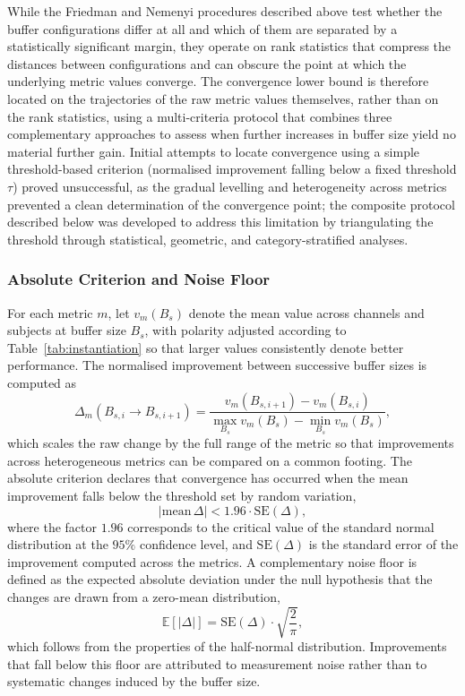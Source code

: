 \documentclass[MScCS,12pt,oneside,final]{uccthesis}
\begin{document}
While the Friedman and Nemenyi procedures described above test whether the buffer configurations differ at all and which of them are separated by a statistically significant margin, they operate on rank statistics that compress the distances between configurations and can obscure the point at which the underlying metric values converge. The convergence lower bound is therefore located on the trajectories of the raw metric values themselves, rather than on the rank statistics, using a multi-criteria protocol that combines three complementary approaches to assess when further increases in buffer size yield no material further gain. Initial attempts to locate convergence using a simple threshold-based criterion (normalised improvement falling below a fixed threshold $\tau$) proved unsuccessful, as the gradual levelling and heterogeneity across metrics prevented a clean determination of the convergence point; the composite protocol described below was developed to address this limitation by triangulating the threshold through statistical, geometric, and category-stratified analyses.

\subsubsection{Absolute Criterion and Noise Floor}

For each metric $m$, let $v_m(B_s)$ denote the mean value across channels and subjects at buffer 
size $B_s$, with polarity adjusted according to Table~\ref{tab:instantiation} so that larger 
values consistently denote better performance. The normalised improvement between successive 
buffer sizes is computed as
\begin{equation}
    \Delta_m(B_{s,i} \to B_{s,i+1}) = \frac{v_m(B_{s,i+1}) - v_m(B_{s,i})}{\max_{B_s} v_m(B_s) - \min_{B_s} v_m(B_s)},
    \label{eq:normalised_improvement}
\end{equation}
which scales the raw change by the full range of the metric so that improvements across 
heterogeneous metrics can be compared on a common footing. The absolute criterion 
declares that convergence has occurred when the mean improvement falls below the threshold set 
by random variation,
\begin{equation}
    |\text{mean}\,\Delta| < 1.96 \cdot \text{SE}(\Delta),
    \label{eq:absolute_criterion}
\end{equation}
where the factor $1.96$ corresponds to the critical value of the standard normal distribution at 
the $95\%$ confidence level, and $\text{SE}(\Delta)$ is the standard error of the improvement 
computed across the metrics. A complementary noise floor is defined as the expected 
absolute deviation under the null hypothesis that the changes are drawn from a zero-mean 
distribution,
\begin{equation}
    \mathbb{E}[|\Delta|] = \text{SE}(\Delta) \cdot \sqrt{\frac{2}{\pi}},
    \label{eq:noise_floor}
\end{equation}
which follows from the properties of the half-normal distribution. Improvements that fall below 
this floor are attributed to measurement noise rather than to systematic changes induced by the 
buffer size.
\end{document}
